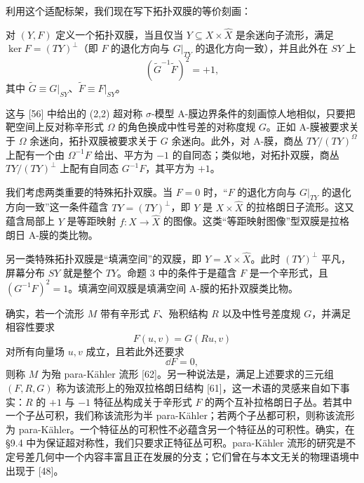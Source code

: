 利用这个适配标架，我们现在写下拓扑双膜的等价刻画：

\begin{proposition}[3]
对 $(Y,F)$ 定义一个拓扑双膜，当且仅当 $Y\subseteq X\times\hat X$ 是余迷向子流形，满足 $\ker F=(TY)^\perp$（即 $F$ 的退化方向与 $G|_{TY}$ 的退化方向一致），并且此外在 $SY$ 上
\[
\left(\tilde G^{-1}\tilde F\right)^2=+1,
\]
其中 $\tilde G\equiv G|_{SY}$、$\tilde F\equiv F|_{SY}$。
\end{proposition}

这与 [56] 中给出的 (2,2) 超对称 $\sigma$-模型 A-膜边界条件的刻画惊人地相似，只要把靶空间上反对称辛形式 $\Omega$ 的角色换成中性号差的对称度规 $G$。正如 A-膜被要求关于 $\Omega$ 余迷向，拓扑双膜被要求关于 $G$ 余迷向。此外，对 A-膜，商丛 $TY/(TY)^\Omega$ 上配有一个由 $\Omega^{-1}F$ 给出、平方为 $-1$ 的自同态；类似地，对拓扑双膜，商丛 $TY/(TY)^\perp$ 上配有自同态 $G^{-1}F$，其平方为 $+1$。

我们考虑两类重要的特殊拓扑双膜。当 $F=0$ 时，“$F$ 的退化方向与 $G|_{TY}$ 的退化方向一致”这一条件蕴含 $TY=(TY)^\perp$，即 $Y$ 是 $X\times\hat X$ 的拉格朗日子流形。这又蕴含局部上 $Y$ 是等距映射 $f:X\to\hat X$ 的图像。这类“等距映射图像”型双膜是拉格朗日 A-膜的类比物。

另一类特殊拓扑双膜是“填满空间”的双膜，即 $Y=X\times\hat X$。此时 $(TY)^\perp$ 平凡，屏幕分布 $SY$ 就是整个 $TY$。命题 3 中的条件于是蕴含 $F$ 是一个辛形式，且 $(G^{-1}F)^2=1$。填满空间双膜是填满空间 A-膜的拓扑双膜类比物。

确实，若一个流形 $M$ 带有辛形式 $F$、殆积结构 $R$ 以及中性号差度规 $G$，并满足相容性要求
\[
F(u,v)=G(Ru,v)
\]
对所有向量场 $u,v$ 成立，且若此外还要求
\[
\dd F=0,
\]
则称 $M$ 为殆 para-Kähler 流形 [62]。另一种说法是，满足上述要求的三元组 $(F,R,G)$ 称为该流形上的殆双拉格朗日结构 [61]，这一术语的灵感来自如下事实：$R$ 的 $+1$ 与 $-1$ 特征丛构成关于辛形式 $F$ 的两个互补拉格朗日子丛。若其中一个子丛可积，我们称该流形为半 para-Kähler；若两个子丛都可积，则称该流形为 para-Kähler。一个特征丛的可积性不必蕴含另一个特征丛的可积性。确实，在 §9.4 中为保证超对称性，我们只要求正特征丛可积。para-Kähler 流形的研究是不定号差几何中一个内容丰富且正在发展的分支；它们曾在与本文无关的物理语境中出现于 [48]。

